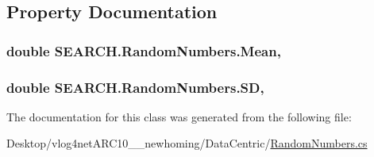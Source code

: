 \subsection{Property Documentation}
\hypertarget{class_s_e_a_r_c_h_1_1_random_numbers_a70d1d40e326e4b1010f881b3a62dc3a9}{
\subsubsection[{Mean}]{\setlength{\rightskip}{0pt plus 5cm}double S\-E\-A\-R\-C\-H.\-Random\-Numbers.\-Mean\hspace{0.3cm}{\ttfamily [get]}, {\ttfamily [set]}}}\label{class_s_e_a_r_c_h_1_1_random_numbers_a70d1d40e326e4b1010f881b3a62dc3a9}
\hypertarget{class_s_e_a_r_c_h_1_1_random_numbers_a2fefa310e792e770eab1b70f98bbd7f6}{
\subsubsection[{S\-D}]{\setlength{\rightskip}{0pt plus 5cm}double S\-E\-A\-R\-C\-H.\-Random\-Numbers.\-S\-D\hspace{0.3cm}{\ttfamily [get]}, {\ttfamily [set]}}}\label{class_s_e_a_r_c_h_1_1_random_numbers_a2fefa310e792e770eab1b70f98bbd7f6}


The documentation for this class was generated from the following file\-:\begin{DoxyCompactItemize}
\item 
Desktop/vlog4net\-A\-R\-C10\-\_\-\_\-newhoming/\-Data\-Centric/\hyperlink{_random_numbers_8cs}{Random\-Numbers.\-cs}\end{DoxyCompactItemize}
